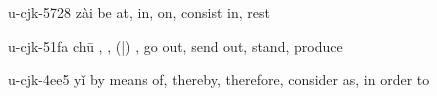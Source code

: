 \begin{multicols}{2}
\lettrine[lines=3]{\cjkgGlue{}}{}\begin{minipage}{0.8\linewidth} u-cjk-5728  zài  \cjkgGlue{} \cjkgGlue{} be at, in, on, consist in, rest \end{minipage}

\lettrine[lines=3]{\cjkgGlue{}}{}\begin{minipage}{0.8\linewidth} u-cjk-51fa  chū  \cjkgGlue{}, \cjkgGlue{}, \cjkgGlue{}(\cjkgGlue{}|\cjkgGlue{})  \cjkgGlue{}, \cjkgGlue{} go out, send out, stand, produce \end{minipage}

\lettrine[lines=3]{\cjkgGlue{}}{}\begin{minipage}{0.8\linewidth} u-cjk-4ee5  yǐ  \cjkgGlue{} \cjkgGlue{} by means of, thereby, therefore, consider as, in order to \end{minipage}



\end{multicols}



